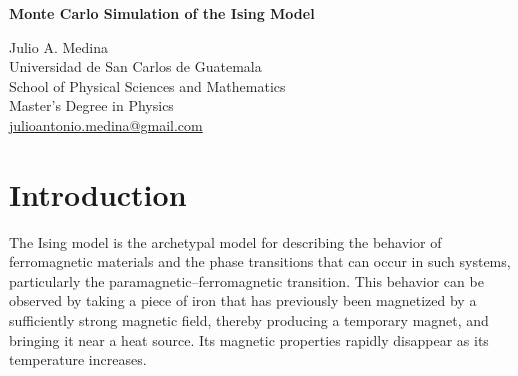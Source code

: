 \documentclass[a4paper]{article}
\begin{document}

\Large
\begin{center}
\textbf{Monte Carlo Simulation of the Ising Model}\\

\hspace{10pt}

\large
Julio A. Medina \\
\hspace{10pt}
\small
Universidad de San Carlos de Guatemala\\
School of Physical Sciences and Mathematics\\
Master's Degree in Physics\\
\href{mailto:julioantonio.medina@gmail.com}{julioantonio.medina@gmail.com}\\
\end{center}

\hspace{10pt}

\begin{abstract}
In statistical mechanics, the Ising model describes the short-range interactions between the magnetic dipole moments of molecular spins in a theoretical model of a ferromagnetic material. The spins are arranged on an $n$-dimensional lattice and take discrete values. In this work, the Ising model is simulated using a Monte Carlo method in order to analyze its behavior and determine whether phase transitions, specifically continuous transitions, occur. Continuous phase transitions and finite-lattice-size effects were observed. These finite-size effects decrease as the lattice size is increased.
\end{abstract}

\normalsize
\section{Introduction}
The Ising model is the archetypal model for describing the behavior of ferromagnetic materials and the phase transitions that can occur in such systems, particularly the paramagnetic--ferromagnetic transition. This behavior can be observed by taking a piece of iron that has previously been magnetized by a sufficiently strong magnetic field, thereby producing a temporary magnet, and bringing it near a heat source. Its magnetic properties rapidly disappear as its temperature increases.
\end{document}
